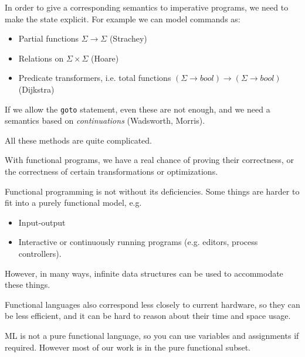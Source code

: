 \begin{slide*}


\vspace*{0.5cm}

In order to give a corresponding semantics to imperative programs, we need to
make the state explicit. For example we can model commands as:

\begin{itemize}

\item Partial functions {\red $\Sigma \to \Sigma$} (Strachey)

\item Relations on {\red $\Sigma \times \Sigma$} (Hoare)

\item Predicate transformers, i.e. total functions {\red $(\Sigma \to bool) \to
(\Sigma \to bool)$} (Dijkstra)

\end{itemize}

If we allow the {\red \tt goto} statement, even these are not enough, and we
need a semantics based on {\em continuations} (Wadsworth, Morris).

All these methods are quite complicated.

With functional programs, we have a real chance of proving their correctness,
or the correctness of certain transformations or optimizations.

\end{slide*}


\begin{slide*}


\vspace*{0.5cm}

Functional programming is not without its deficiencies. Some things are harder
to fit into a purely functional model, e.g.

\begin{itemize}

\item Input-output

\item Interactive or continuously running programs (e.g. editors, process
controllers).

\end{itemize}

However, in many ways, infinite data structures can be used to accommodate
these things.

Functional languages also correspond less closely to current hardware, so they
can be less efficient, and it can be hard to reason about their time and space
usage.

ML is not a pure functional language, so you can use variables and assignments
if required. However most of our work is in the pure functional subset.

\end{slide*}




